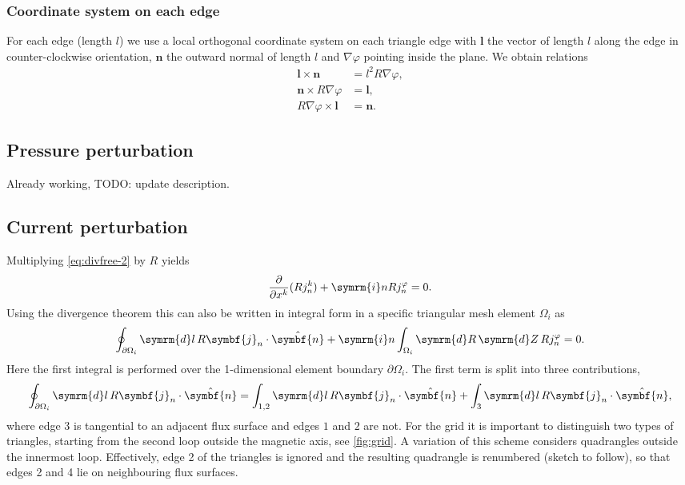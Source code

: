 \documentclass[a4paper, 10pt, english]{article}
\let\temp\vartheta
\let\vartheta\theta
\let\theta\temp
\let\temp\varphi
\let\varphi\phi
\let\phi\temp
\let\vec\symbf
\newcommand*\diff{\ensuremath{\symrm{d}}}
\newcommand*\im{\ensuremath{\symrm{i}}}
\newcommand*\pd[2][]{\ensuremath{\frac{\partial #1}{\partial #2}}}
\begin{document}
\subsubsection{Coordinate system on each edge}

For each edge (length $l$) we use a local orthogonal coordinate system on each triangle edge with $\vec{l}$ the vector of length $l$ along the edge in counter-clockwise orientation, $\vec{n}$ the outward normal of length $l$ and $\nabla \phi$ pointing inside the plane. We obtain relations
\begin{align}
  \vec{l} \times \vec{n} &= l^{2} R \nabla \phi, \\
  \vec{n} \times R \nabla \phi &= \vec{l}, \\
  R \nabla \phi \times \vec{l} &= \vec{n}.
\end{align}

\subsection{Pressure perturbation}

Already working, TODO: update description.

\subsection{Current perturbation}

Multiplying \cref{eq:divfree-2} by $R$ yields
\begin{gather}
  \pd{x^{k}} (R j_{n}^{k}) + \im n R j_{n}^{\phi} = 0.
\end{gather}
Using the divergence theorem this can also be written in integral form in a specific triangular mesh element $\Omega_{i}$ as
\begin{gather}
  \oint_{\partial \Omega_{i}} \diff l \, R \vec{j}_{n} \cdot \hat{\vec{n}} + \im n \int_{\Omega_{i}} \diff R \, \diff Z \, R j_{n}^{\phi} = 0.
\end{gather}
Here the first integral is performed over the 1-dimensional element boundary $\partial \Omega_{i}$. The first term is split into three contributions,
\begin{gather}
  \oint_{\partial \Omega_{i}} \diff l \, R \vec{j}_{n} \cdot \hat{\vec{n}} = \int_{1, 2} \diff l \, R \vec{j}_{n} \cdot \hat{\vec{n}} + \int_{3} \diff l \, R \vec{j}_{n} \cdot \hat{\vec{n}}, \label{eq:integral law}
\end{gather}
where edge $3$ is tangential to an adjacent flux surface and edges $1$ and $2$ are not. For the grid it is important to distinguish two types of triangles, starting from the second loop outside the magnetic axis, see \cref{fig:grid}. A variation of this scheme considers quadrangles outside the innermost loop. Effectively, edge 2 of the triangles is ignored and the resulting quadrangle is renumbered (sketch to follow), so that edges 2 and 4 lie on neighbouring flux surfaces.
\end{document}
